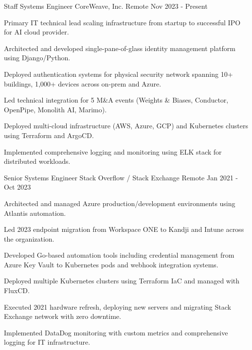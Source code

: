 
\begin{cventries}

	\cventry
	{Staff Systems Engineer}
	{CoreWeave, Inc.}
	{Remote}
	{Nov 2023 - Present}
	{
		\begin{cvitems}
		\item {Primary IT technical lead scaling infrastructure from startup to successful IPO for AI cloud provider.}
		\item {Architected and developed single-pane-of-glass identity management platform using Django/Python.}
		\item {Deployed authentication systems for physical security network spanning 10+ buildings, 1,000+ devices across on-prem and Azure.}
		\item {Led technical integration for 5 M\&A events (Weights \& Biases, Conductor, OpenPipe, Monolith AI, Marimo).}
		\item {Deployed multi-cloud infrastructure (AWS, Azure, GCP) and Kubernetes clusters using Terraform and ArgoCD.}
		\item {Implemented comprehensive logging and monitoring using ELK stack for distributed workloads.}
		\end{cvitems}
	}
	\vspace{3mm}


	\cventry
	{Senior Systems Engineer}
	{Stack Overflow / Stack Exchange}
	{Remote}
	{Jan 2021 - Oct 2023}
	{
		\begin{cvitems}
		\item {Architected and managed Azure production/development environments using Atlantis automation.}
		\item {Led 2023 endpoint migration from Workspace ONE to Kandji and Intune across the organization.}
		\item {Developed Go-based automation tools including credential management from Azure Key Vault to Kubernetes pods and webhook integration systems.}
		\item {Deployed multiple Kubernetes clusters using Terraform IaC and managed with FluxCD.}
		\item {Executed 2021 hardware refresh, deploying new servers and migrating Stack Exchange network with zero downtime.}
		\item {Implemented DataDog monitoring with custom metrics and comprehensive logging for IT infrastructure.}
		\end{cvitems}
	}
	\vspace{3mm}


\end{cventries}
